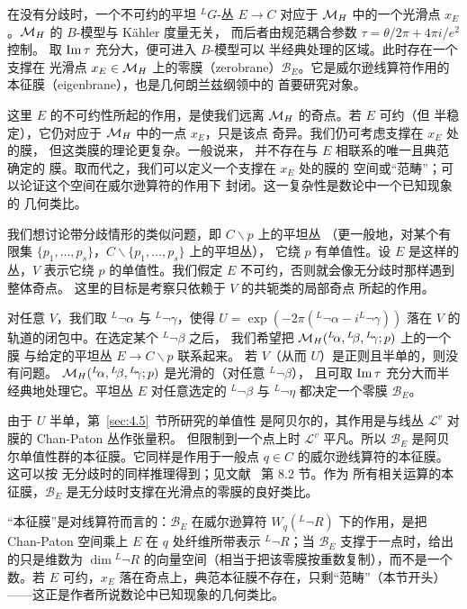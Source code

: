 \label{sec:4.6}

在没有分歧时，一个不可约的平坦 $^LG$-丛 $E\to C$ 对应于
${{\mathcal{M}}_H}$ 中的一个光滑点 $x_E$。${{\mathcal{M}}_H}$ 的 $B$-模型与 Kähler 度量无关，
而后者由规范耦合参数 $\tau=\theta/2\pi+4\pi i/e^2$ 控制。
取 ${\rm Im}\,\tau$ 充分大，便可进入 $B$-模型可以
半经典处理的区域。此时存在一个支撑在
光滑点 $x_E\in{{\mathcal{M}}_H}$ 上的零膜（zerobrane）${\mathcal B}_E$。它是威尔逊线算符作用的
本征膜（eigenbrane），也是几何朗兰兹纲领中的
首要研究对象。

这里 $E$ 的不可约性所起的作用，是使我们远离
${{\mathcal{M}}_H}$ 的奇点。若 $E$ 可约（但
半稳定），它仍对应于 ${{\mathcal{M}}_H}$ 中的一点 $x_E$，只是该点
奇异。我们仍可考虑支撑在 $x_E$ 处的膜，
但这类膜的理论更复杂。一般说来，
并不存在与 $E$ 相联系的唯一且典范确定的
膜。取而代之，我们可以定义一个支撑在 $x_E$ 处的膜的
空间或“范畴”；可以论证这个空间在威尔逊算符的作用下
封闭。这一复杂性是数论中一个已知现象的
几何类比。

我们想讨论带分歧情形的类似问题，即
$C\backslash p$ 上的平坦丛
（更一般地，对某个有限集 $\{p_1,\dots,p_s\}$，$C\backslash\{p_1,\dots,p_s\}$ 上的平坦丛），
它绕 $p$ 有单值性。设 $E$ 是这样的丛，$V$ 表示它绕 $p$ 的单值性。我们假定
$E$ 不可约，否则就会像无分歧时那样遇到整体奇点。
这里的目标是考察只依赖于 $V$ 的共轭类的局部奇点
所起的作用。

对任意 $V$，我们取 $^L\neg\alpha$ 与 $^L\neg\gamma$，使得 $U=\exp(-2\pi({}^L\neg\alpha-i
{}^L\neg\gamma))$
落在 $V$ 的轨道的闭包中。在选定某个 $^L\neg\beta$ 之后，
我们希望把 ${{\mathcal{M}}_H}({}^L\negthinspace\alpha,{}^L\negthinspace\beta,{}^L\negthinspace\gamma;p)$ 上的一个膜
与给定的平坦丛 $E\to
C\backslash p$ 联系起来。
若 $V$（从而 $U$）是正则且半单的，则没有问题。
${{\mathcal{M}}_H}({}^L\negthinspace\alpha,{}^L\negthinspace\beta,{}^L\negthinspace\gamma;p)$
是光滑的（对任意 ${}^L\neg\beta$），
且可取 ${\rm Im}\,\tau$
充分大而半经典地处理它。平坦丛 $E$ 对任意选定的 ${}^L\neg\beta$ 与 ${}^L\neg\eta$
都决定一个零膜 ${\mathcal B}_E$。

由于 $U$ 半单，第~\ref{sec:4.5}~节所研究的单值性
是阿贝尔的，其作用是与线丛
${\mathcal L}^v$ 对膜的 Chan-Paton 丛作张量积。
但限制到一个点上时 ${\mathcal L}^v$ 平凡。所以 ${\mathcal B}_E$
是阿贝尔单值性群的本征膜。它同样是作用于一般点 $q\in C$
的威尔逊线算符的本征膜。这可以按
无分歧时的同样推理得到；见文献~\cite{ref8} 第 8.2 节。作为
所有相关运算的本征膜，${\mathcal B}_E$
是无分歧时支撑在光滑点的零膜的良好类比。

\begin{yizhu}[易错点]“本征膜”是对线算符而言的：$\mathcal B_E$ 在威尔逊算符 $W_q({}^L\neg R)$ 下的作用，是把 Chan-Paton 空间乘上 $E$ 在 $q$ 处纤维所带表示 ${}^L\neg R$；当 $\mathcal B_E$ 支撑于一点时，给出的只是维数为 $\dim{}^L\neg R$ 的向量空间（相当于把该零膜按重数复制），而不是一个数。若 $E$ 可约，$x_E$ 落在奇点上，典范本征膜不存在，只剩“范畴”（本节开头）——这正是作者所说数论中已知现象的几何类比。\end{yizhu}

